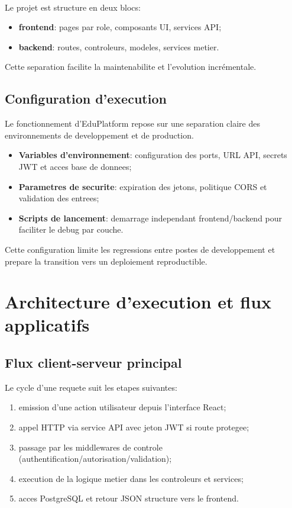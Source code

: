 ﻿﻿\documentclass[12pt,a4paper,oneside]{report}
\begin{document}
Le projet est structure en deux blocs:
\begin{itemize}
  \item \textbf{frontend}: pages par role, composants UI, services API;
  \item \textbf{backend}: routes, controleurs, modeles, services metier.
\end{itemize}

Cette separation facilite la maintenabilite et l'evolution incrémentale.

\subsection{Configuration d'execution}

Le fonctionnement d'EduPlatform repose sur une separation claire des environnements de developpement et de production.
\begin{itemize}
  \item \textbf{Variables d'environnement}: configuration des ports, URL API, secrets JWT et acces base de donnees;
  \item \textbf{Parametres de securite}: expiration des jetons, politique CORS et validation des entrees;
  \item \textbf{Scripts de lancement}: demarrage independant frontend/backend pour faciliter le debug par couche.
\end{itemize}

Cette configuration limite les regressions entre postes de developpement et prepare la transition vers un deploiement reproductible.

\section{Architecture d'execution et flux applicatifs}

\subsection{Flux client-serveur principal}

Le cycle d'une requete suit les etapes suivantes:
\begin{enumerate}
  \item emission d'une action utilisateur depuis l'interface React;
  \item appel HTTP via service API avec jeton JWT si route protegee;
  \item passage par les middlewares de controle (authentification/autorisation/validation);
  \item execution de la logique metier dans les controleurs et services;
  \item acces PostgreSQL et retour JSON structure vers le frontend.
\end{enumerate}
\end{document}
